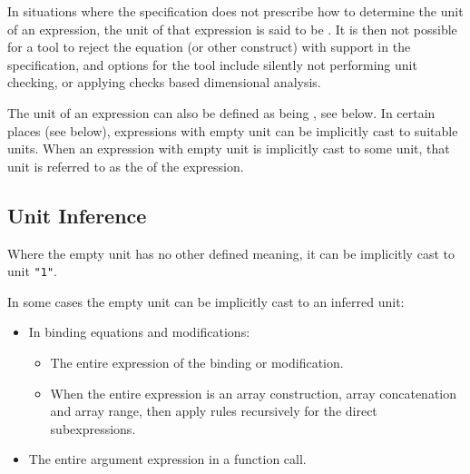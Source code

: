 In situations where the specification does not prescribe how to determine the unit of an expression, the unit of that expression is said to be .
It is then not possible for a tool to reject the equation (or other construct) with support in the specification, and options for the tool include silently not performing unit checking, or applying checks based dimensional analysis.

The unit of an expression can also be defined as being , see below.
In certain places (see below), expressions with empty unit can be implicitly cast to suitable units.
When an expression with empty unit is implicitly cast to some unit, that unit is referred to as the  of the expression.


\subsection{Unit Inference}\label{unit-inference}

Where the empty unit has no other defined meaning, it can be implicitly cast to unit \lstinline!"1"!.

In some cases the empty unit can be implicitly cast to an inferred unit:
\begin{itemize}
\item
  In binding equations and modifications:
  \begin{itemize}
  \item The entire expression of the binding or modification.
  \item When the entire expression is an array construction, array concatenation and array range, then apply rules recursively for the direct subexpressions.
  \end{itemize}
\item
  The entire argument expression in a function call.
\end{itemize}


